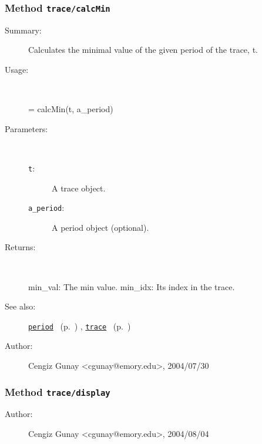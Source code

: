\subsubsection[Method \texttt{calcMin}]{Method \texttt{trace/calcMin}}%
%
\label{ref_trace__calcMin}%
\hypertarget{ref_trace__calcMin}{}%
\begin{description}
\item[Summary:]Calculates the minimal value of the given period 
 		of the trace, t. 
%
\item[Usage:]~%
\begin{lyxcode}%
[min\_val, min\_idx] = calcMin(t, a\_period)
%
\end{lyxcode}%
%
%
\item[Parameters:]~
\begin{description}%
\item[\texttt{t}:]
 A trace object.
\item[\texttt{a\_period}:]
 A period object (optional).
\end{description}%
%
\item[Returns:
]~

	min\_val: The min value.
	min\_idx: Its index in the trace.
%
%
\item[See also:]%
\hyperlink{ref_period}{\texttt{period}}%
\ (p.~\pageref{ref_period})%
%
, \hyperlink{ref_trace}{\texttt{trace}}%
\ (p.~\pageref{ref_trace})%
%
%
\item[Author:]%
Cengiz Gunay <cgunay@emory.edu>, 2004/07/30
%
\end{description}
\methodline%
\subsubsection[Method \texttt{display}]{Method \texttt{trace/display}}%
%
\label{ref_trace__display}%
\hypertarget{ref_trace__display}{}%
\begin{description}
%
%
%
%
%
%
%
\item[Author:]%
Cengiz Gunay <cgunay@emory.edu>, 2004/08/04
%
\end{description}
\methodline%
